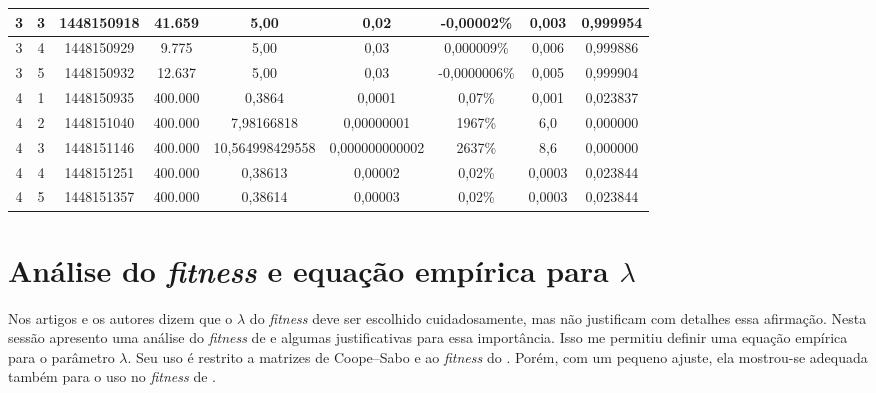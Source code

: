 \begin{landscape}
\begin{center}
\begin{table}[htbp]
\begin{tabular}{ccccccccc}
\hline
         3 &          3 & 1448150918 &     41.659 &       5,00 &       0,02 & -0,00002\% &      0,003 &   0,999954 \\
\hline
         3 &          4 & 1448150929 &      9.775 &       5,00 &       0,03 & 0,000009\% &      0,006 &   0,999886 \\
\hline
         3 &          5 & 1448150932 &     12.637 &       5,00 &       0,03 & -0,0000006\% &      0,005 &   0,999904 \\
\hline \hline
         4 &          1 & 1448150935 &    400.000 &     0,3864 &     0,0001 &     0,07\% &      0,001 &   0,023837 \\
\hline
         4 &          2 & 1448151040 &    400.000 & 7,98166818 & 0,00000001 &     1967\% &        6,0 &   0,000000 \\
\hline
         4 &          3 & 1448151146 &    400.000 & 10,564998429558 & 0,000000000002 &     2637\% &        8,6 &   0,000000 \\
\hline
         4 &          4 & 1448151251 &    400.000 &    0,38613 &    0,00002 &     0,02\% &     0,0003 &   0,023844 \\
\hline
         4 &          5 & 1448151357 &    400.000 &    0,38614 &    0,00003 &     0,02\% &     0,0003 &   0,023844 \\
\hline \hline
\end{tabular}  
\end{table}
\end{center}	
\end{landscape}

	\section{Análise do \emph{fitness} e equação empírica para $\lambda$}\label{sec:eq_lambda}
	
	Nos artigos \cite{metodo2004} e \cite{metodo2011} os autores dizem que o $\lambda$ do \emph{fitness} deve ser escolhido cuidadosamente, mas não justificam com detalhes essa afirmação. Nesta sessão apresento uma análise do \emph{fitness} de \cite{metodo2011} e algumas justificativas para essa importância. Isso me permitiu definir uma equação empírica para o parâmetro $\lambda$. Seu uso é restrito a matrizes de Coope--Sabo e ao \emph{fitness} do \cite{metodo2011}. Porém, com um pequeno ajuste, ela mostrou-se adequada também para o uso no \emph{fitness} de \cite{metodo2004}.
	
